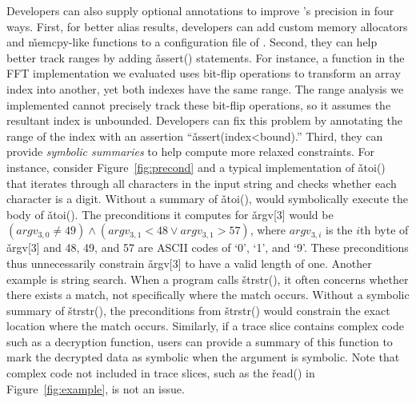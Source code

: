 Developers can also supply optional annotations to improve \peregrine's
precision in four ways.  First, for better alias results, developers can
add custom memory allocators and \v{memcpy}-like functions to a
configuration file of \peregrine.  Second, they can help \peregrine better track
ranges by adding \v{assert()} statements.  For instance, a function in the
FFT implementation we evaluated uses bit-flip operations to transform an
array index into another, yet both indexes have the same range.  The range
analysis we implemented cannot precisely track these bit-flip operations,
so it assumes the resultant index is unbounded.  Developers can fix this
problem by annotating the range of the index with an assertion
``\v{assert(index<bound)}.''  Third, they can provide \emph{symbolic
  summaries} to help \peregrine compute more relaxed constraints.  For instance,
consider Figure~\ref{fig:precond} and a typical implementation of
\v{atoi()} that iterates through all characters in the input string and
checks whether each character is a digit.  Without a summary of \v{atoi()},
\peregrine would symbolically execute the body of \v{atoi()}.  The preconditions
it computes for \v{argv[3]} would be $ (argv_{3,0} \neq 49) \wedge
(argv_{3,1} < 48 \vee argv_{3,1} > 57)$, where $argv_{3,i}$ is the $i$th
byte of \v{argv[3]} and 48, 49, and 57 are ASCII codes of `0', `1', and
`9'.  These preconditions thus unnecessarily constrain \v{argv[3]} to
have a valid length of one.  Another example is string search.  When a
program calls \v{strstr()}, it often concerns whether there exists a
match, not specifically where the match occurs.  Without a symbolic
summary of \v{strstr()}, the preconditions from \v{strstr()} would
constrain the exact location where the match occurs.  Similarly, if a
trace slice contains complex code such as a decryption function, users can
provide a summary of this function to mark the decrypted data as symbolic
when the argument is symbolic.  Note that complex code not included in
trace slices, such as the \v{read()} in Figure~\ref{fig:example}, is not an
issue.


